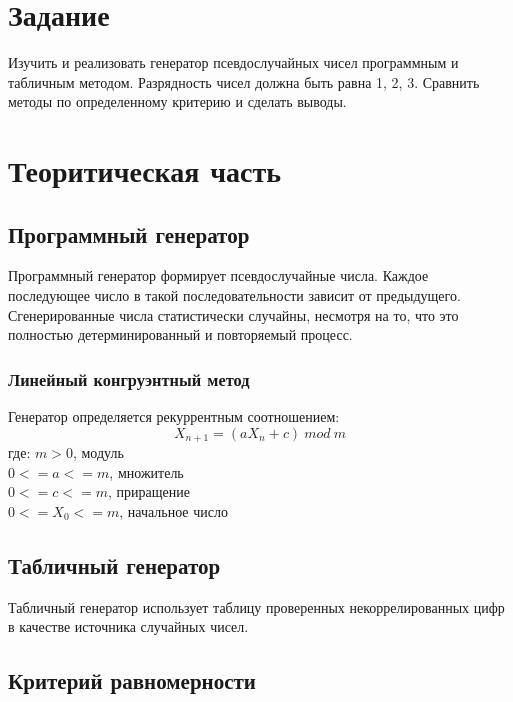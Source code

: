 \section{Задание}

Изучить и реализовать генератор псевдослучайных чисел программным и табличным методом.
Разрядность чисел должна быть равна 1, 2, 3.
Сравнить методы по определенному критерию и сделать выводы.

\section{Теоритическая часть}

\subsection{Программный генератор}

Программный генератор формирует псевдослучайные числа. Каждое последующее число в такой последовательности зависит от предыдущего.
Сгенерированные числа статистически случайны, несмотря на то, что это полностью детерминированный и повторяемый процесс.

\subsubsection{Линейный конгруэнтный метод}
Генератор определяется рекуррентным соотношением:
\begin{equation*}
    X_{n+1} = (a X_n + c) \ mod \ m
\end{equation*}
где:
\hspace*{.7cm} $m > 0$, модуль \\
\hspace*{1.5cm} $0 <= a <= m$, множитель \\
\hspace*{1.5cm} $0 <= c  <= m$, приращение \\
\hspace*{1.5cm} $0 <= X_0  <= m$, начальное число


\subsection{Табличный генератор}

Табличный генератор использует таблицу проверенных некоррелированных цифр в качестве источника случайных чисел.

\subsection{Критерий равномерности}

